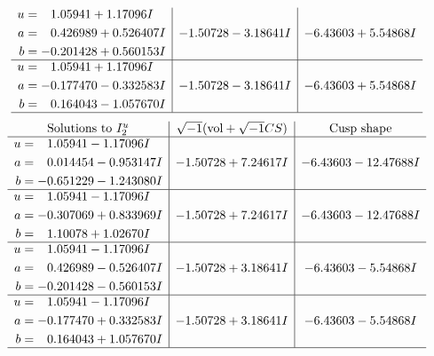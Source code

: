 \documentclass[1p]{elsarticle_modified}
\theoremstyle{definition}
\newcommand{\I}{\sqrt{-1}}
\begin{document}
$$\begin{array}{c|c|c}
\begin{aligned}
u &= \phantom{-}1.05941 + 1.17096 I \\
a &= \phantom{-}0.426989 + 0.526407 I \\
b &= -0.201428 + 0.560153 I\end{aligned}
 & -1.50728 - 3.18641 I & -6.43603 + 5.54868 I \\ \hline\begin{aligned}
u &= \phantom{-}1.05941 + 1.17096 I \\
a &= -0.177470 - 0.332583 I \\
b &= \phantom{-}0.164043 - 1.057670 I\end{aligned}
 & -1.50728 - 3.18641 I & -6.43603 + 5.54868 I\\
 \hline 
 \end{array}$$\newpage$$\begin{array}{c|c|c}  
\text{Solutions to }I^u_{2}& \I (\text{vol} + \sqrt{-1}CS) & \text{Cusp shape}\\
 \hline 
\begin{aligned}
u &= \phantom{-}1.05941 - 1.17096 I \\
a &= \phantom{-}0.014454 - 0.953147 I \\
b &= -0.651229 - 1.243080 I\end{aligned}
 & -1.50728 + 7.24617 I & -6.43603 - 12.47688 I \\ \hline\begin{aligned}
u &= \phantom{-}1.05941 - 1.17096 I \\
a &= -0.307069 + 0.833969 I \\
b &= \phantom{-}1.10078 + 1.02670 I\end{aligned}
 & -1.50728 + 7.24617 I & -6.43603 - 12.47688 I \\ \hline\begin{aligned}
u &= \phantom{-}1.05941 - 1.17096 I \\
a &= \phantom{-}0.426989 - 0.526407 I \\
b &= -0.201428 - 0.560153 I\end{aligned}
 & -1.50728 + 3.18641 I & -6.43603 - 5.54868 I \\ \hline\begin{aligned}
u &= \phantom{-}1.05941 - 1.17096 I \\
a &= -0.177470 + 0.332583 I \\
b &= \phantom{-}0.164043 + 1.057670 I\end{aligned}
 & -1.50728 + 3.18641 I & -6.43603 - 5.54868 I\\
 \hline 
 \end{array}$$\newpage\newpage\renewcommand{\arraystretch}{1}
\end{document}
